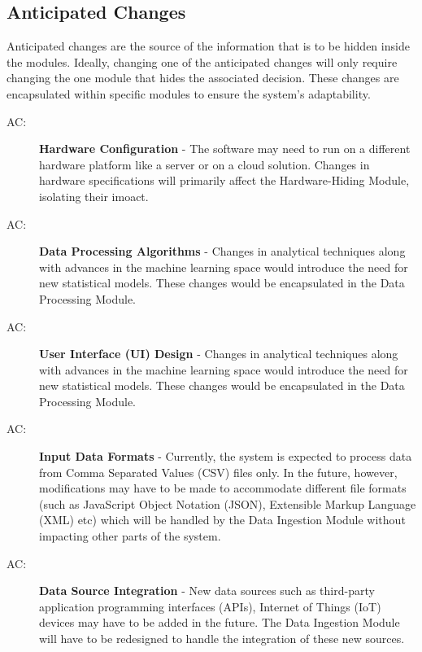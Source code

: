 \documentclass[12pt, titlepage]{article}
\newcounter{acnum}
\newcommand{\actheacnum}{AC\theacnum}
\begin{document}
\subsection{Anticipated Changes} \label{SecAchange}

Anticipated changes are the source of the information that is to be hidden
inside the modules. Ideally, changing one of the anticipated changes will only
require changing the one module that hides the associated decision. These changes
are encapsulated within specific modules to ensure the system's adaptability.

\begin{description}
  \item[ \actheacnum \label{acHardware}:] \textbf{Hardware Configuration} - 
  The software may need to run on a different hardware platform like a server or on a 
  cloud solution. Changes in hardware specifications will primarily affect the Hardware-Hiding 
  Module, isolating their imoact.
  
  \item[ \actheacnum \label{acProcessing}:] \textbf{Data Processing Algorithms} - 
  Changes in analytical techniques along with advances in the machine learning space would
  introduce the need for new statistical models. These changes would be encapsulated in the
  Data Processing Module.

  \item[ \actheacnum \label{acInterface}:] \textbf{User Interface (UI) Design} - 
  Changes in analytical techniques along with advances in the machine learning space would
  introduce the need for new statistical models. These changes would be encapsulated in the
  Data Processing Module.

  \item[ \actheacnum \label{acInput}:] \textbf{Input Data Formats} - 
  Currently, the system is expected to process data from Comma Separated Values (CSV) files only.
  In the future, however, modifications may have to be made to accommodate different file 
  formats (such as JavaScript Object Notation (JSON), Extensible Markup Language (XML) etc)
  which will be handled by the Data Ingestion Module without impacting other parts of the system.

  \item[ \actheacnum \label{acSource}:] \textbf{Data Source Integration} - 
  New data sources such as third-party application programming interfaces (APIs), Internet of Things
  (IoT) devices may have to be added in the future. The Data Ingestion Module will have to be 
  redesigned to handle the integration of these new sources.


\end{description}
\end{document}
